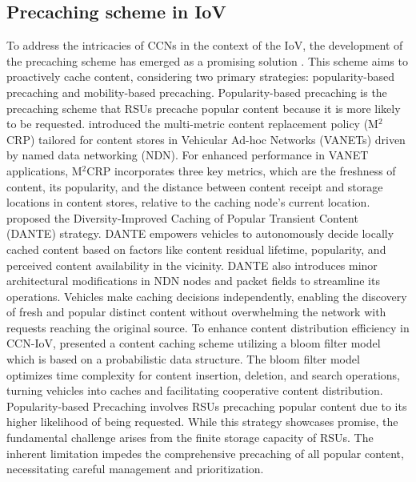 \documentclass[journal]{IEEEtran}
\begin{document}
\subsection{Precaching scheme in IoV}
To address the intricacies of CCNs in the context of the IoV, the development of the precaching scheme has emerged as a promising solution \cite{Ostrovskaya2018, Amadeo2021, Dua2019, Park2019, Ahani2018, AlNagar2019, Liang2018}.
This scheme aims to proactively cache content, considering two primary strategies: popularity-based precaching and mobility-based precaching.
Popularity-based precaching is the precaching scheme that RSUs precache popular content because it is more likely to be requested.
\cite{Ostrovskaya2018} introduced the multi-metric content replacement policy (M$^{2}$CRP) tailored for content stores in Vehicular Ad-hoc Networks (VANETs) driven by named data networking (NDN).
For enhanced performance in VANET applications, M$^{2}$CRP incorporates three key metrics, which are the freshness of content, its popularity, and the distance between content receipt and storage locations in content stores, relative to the caching node's current location.
\cite{Amadeo2021} proposed the Diversity-Improved Caching of Popular Transient Content (DANTE) strategy.
DANTE empowers vehicles to autonomously decide locally cached content based on factors like content residual lifetime, popularity, and perceived content availability in the vicinity.
DANTE also introduces minor architectural modifications in NDN nodes and packet fields to streamline its operations.
Vehicles make caching decisions independently, enabling the discovery of fresh and popular distinct content without overwhelming the network with requests reaching the original source.
To enhance content distribution efficiency in CCN-IoV, \cite{Dua2019} presented a content caching scheme utilizing a bloom filter model which is based on a probabilistic data structure.
The bloom filter model optimizes time complexity for content insertion, deletion, and search operations, turning vehicles into caches and facilitating cooperative content distribution.
Popularity-based Precaching involves RSUs precaching popular content due to its higher likelihood of being requested.
While this strategy showcases promise, the fundamental challenge arises from the finite storage capacity of RSUs.
The inherent limitation impedes the comprehensive precaching of all popular content, necessitating careful management and prioritization.
\end{document}
